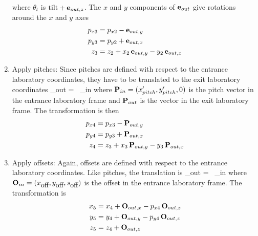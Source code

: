 \begin{enumerate}
where $\theta_t$ is $\mbox{tilt} + {\bf e}_{out,z}$. The $x$ and $y$ components
of ${\bf e}_{out}$ give rotations around the $x$ and $y$ axes
\begin{align}
  p_{x3} &= p_{x2} - {\bf e}_{out,y} \nonumber \\
  p_{y3} &= p_{y2} + {\bf e}_{out,x} \\
  z_3    &= z_2 + x_2 \, {\bf e}_{out,y} - y_2 \, {\bf e}_{out,x}
\end{align}
  \item
Apply pitches: Since pitches are defined with
respect to the entrance laboratory coordinates, they have to be
translated to the exit laboratory coordinates
\Begineq
  \bfP_{out} = \bfS \, \bfP_{in}
\Endeq
where ${\bf P}_{in} = (x'_{pitch}, y'_{pitch}, 0)$ is the pitch vector in
the entrance laboratory frame and ${\bf P}_{out}$ is the vector in the exit
laboratory frame. The transformation is then
\begin{align}
  p_{x4} &= p_{x3} - {\bf P}_{out,y} \nonumber \\
  p_{y4} &= p_{y3} + {\bf P}_{out,x} \\
  z_4    &= z_3 + x_3 \, {\bf P}_{out,y} - y_3 \, {\bf P}_{out,x}
\end{align}
  \item
Apply offsets: Again, offsets are defined with respect to the
entrance laboratory coordinates. Like pitches, the translation is
\Begineq
  \bfO_{out} = \bfS \, \bfO_{in}
\Endeq
where ${\bf O}_{in} = (x_{\mbox{off}}, y_{\mbox{off}}, s_{\mbox{off}})$ is the offset in the
entrance laboratory frame. The transformation is
\begin{align}
  x_5 &= x_4 + {\bf O}_{out,x} - p_{x4} \, {\bf O}_{out,z} \nonumber \\
  y_5 &= y_4 + {\bf O}_{out,y} - p_{y4} \, {\bf O}_{out,z} \\
  z_5 &= z_4 + {\bf O}_{out,z} 
\end{align}
  \end{enumerate}


